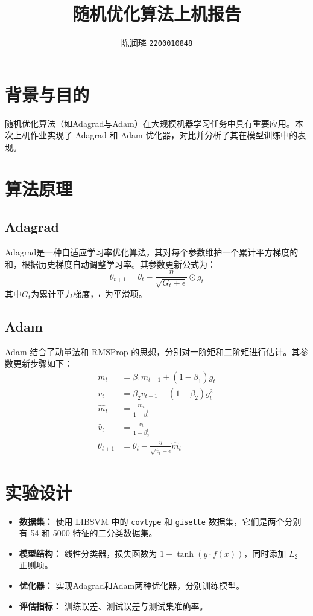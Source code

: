 \documentclass{article}
\title{随机优化算法上机报告}
\author{陈润璘 \texttt{2200010848}}
\begin{document}
\maketitle

\section{背景与目的}
随机优化算法（如Adagrad与Adam）在大规模机器学习任务中具有重要应用。本次上机作业实现了 Adagrad 和 Adam 优化器，对比并分析了其在模型训练中的表现。

\section{算法原理}
\subsection{Adagrad}
Adagrad是一种自适应学习率优化算法，其对每个参数维护一个累计平方梯度的和，根据历史梯度自动调整学习率。其参数更新公式为：
\begin{equation}
    \theta_{t+1} = \theta_t - \frac{\eta}{\sqrt{G_t + \epsilon}} \odot g_t
\end{equation}
其中$G_t$为累计平方梯度，$\epsilon$ 为平滑项。

\subsection{Adam}
Adam 结合了动量法和 RMSProp 的思想，分别对一阶矩和二阶矩进行估计。其参数更新步骤如下：
\begin{align}
    m_t &= \beta_1 m_{t-1} + (1-\beta_1)g_t \\
    v_t &= \beta_2 v_{t-1} + (1-\beta_2)g_t^2 \\
    \hat{m}_t &= \frac{m_t}{1-\beta_1^t} \\
    \hat{v}_t &= \frac{v_t}{1-\beta_2^t} \\
    \theta_{t+1} &= \theta_t - \frac{\eta}{\sqrt{\hat{v}_t}+\epsilon} \hat{m}_t
\end{align}

\section{实验设计}
\begin{itemize}
    \item \textbf{数据集：} 使用 LIBSVM 中的 \texttt{covtype} 和 \texttt{gisette} 数据集，它们是两个分别有 54 和 5000 特征的二分类数据集。
    \item \textbf{模型结构：} 线性分类器，损失函数为 $1-\tanh(y\cdot f(x))$，同时添加 $L_2$ 正则项。
    \item \textbf{优化器：} 实现Adagrad和Adam两种优化器，分别训练模型。
    \item \textbf{评估指标：} 训练误差、测试误差与测试集准确率。
\end{itemize}
\end{document}
